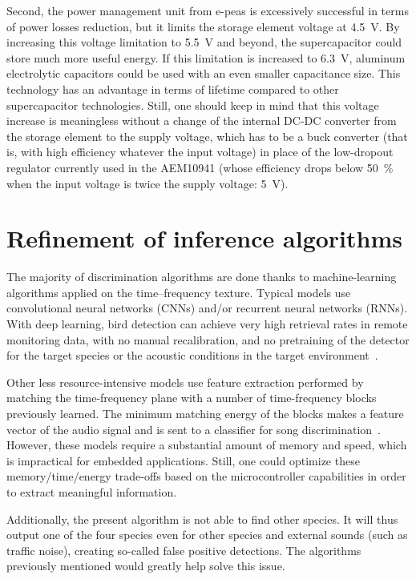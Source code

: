 \documentclass{EPL-master-thesis-covers-EN}
\begin{document}
Second, the power management unit from e-peas is excessively successful in terms of power losses reduction, but it limits the storage element voltage at \SI{4.5}{V}. By increasing this voltage limitation to \SI{5.5}{V} and beyond, the supercapacitor could store much more useful energy. If this limitation is increased to \SI{6.3}{V}, aluminum electrolytic capacitors could be used with an even smaller capacitance size. This technology has an advantage in terms of lifetime compared to other supercapacitor technologies. Still, one should keep in mind that this voltage increase is meaningless without a change of the internal DC-DC converter from the storage element to the supply voltage, which has to be a buck converter (that is, with high efficiency whatever the input voltage) in place of the low-dropout regulator currently used in the AEM10941 (whose efficiency drops below \SI{50}{\%} when the input voltage is twice the supply voltage: \SI{5}{V}).



\section{Refinement of inference algorithms}

The majority of discrimination algorithms are done thanks to machine-learning algorithms applied on the time--frequency texture. Typical models use convolutional neural networks (CNNs) and/or recurrent neural networks (RNNs).
With deep learning, bird detection can achieve very high retrieval rates in remote monitoring data, with no manual recalibration, and no pretraining of the detector for the target species or the acoustic conditions in the target environment~\cite{Stowell2018}.

Other less resource-intensive models use feature extraction performed by matching the time-frequency plane with a number of time-frequency blocks previously learned. The minimum matching energy of the blocks makes a feature vector of the audio signal and is sent to a classifier for song discrimination~\cite{4959924}.
However, these models require a substantial amount of memory and speed, which is impractical for embedded applications. Still, one could optimize these memory/time/energy trade-offs based on the microcontroller capabilities in order to extract meaningful information.

Additionally, the present algorithm is not able to find other species. It will thus output one of the four species even for other species and external sounds (such as traffic noise), creating so-called false positive detections. The algorithms previously mentioned would greatly help solve this issue.
\end{document}
